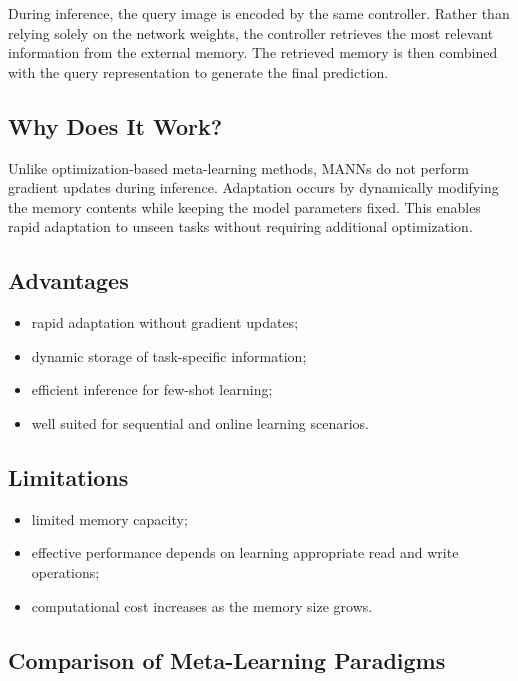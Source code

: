 During inference, the query image is encoded by the same controller. Rather than relying solely on the network weights, the controller retrieves the most relevant information from the external memory. The retrieved memory is then combined with the query representation to generate the final prediction.
\subsection*{Why Does It Work?}

Unlike optimization-based meta-learning methods, MANNs do not perform gradient updates during inference. Adaptation occurs by dynamically modifying the memory contents while keeping the model parameters fixed. This enables rapid adaptation to unseen tasks without requiring additional optimization.
\subsection*{Advantages}

\begin{itemize}
\item rapid adaptation without gradient updates;
\item dynamic storage of task-specific information;
\item efficient inference for few-shot learning;
\item well suited for sequential and online learning scenarios.
\end{itemize}

\subsection*{Limitations}

\begin{itemize}
\item limited memory capacity;
\item effective performance depends on learning appropriate read and write operations;
\item computational cost increases as the memory size grows.
\end{itemize}
\subsection*{Comparison of Meta-Learning Paradigms}


